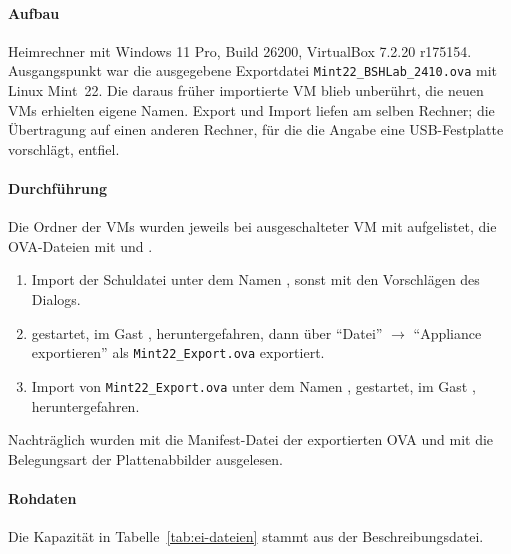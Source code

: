 \begin{messung}
\paragraph{Aufbau} Heimrechner mit Windows 11 Pro, Build 26200, VirtualBox 7.2.20 r175154. Ausgangspunkt war die ausgegebene Exportdatei \nolinkurl{Mint22_BSHLab_2410.ova} mit Linux Mint~22. Die daraus früher importierte VM  blieb unberührt, die neuen VMs erhielten eigene Namen. Export und Import liefen am selben Rechner; die Übertragung auf einen anderen Rechner, für die die Angabe eine USB-Festplatte vorschlägt, entfiel.

\paragraph{Durchführung} Die Ordner der VMs wurden jeweils bei ausgeschalteter VM mit  aufgelistet, die OVA-Dateien mit  und .
\begin{enumerate}[nosep, label=\arabic*.]
  \item Import der Schuldatei unter dem Namen , sonst mit den Vorschlägen des Dialogs.
  \item {} gestartet, im Gast , heruntergefahren, dann über \enquote{Datei} $\rightarrow$ \enquote{Appliance exportieren} als \nolinkurl{Mint22_Export.ova} exportiert.
  \item Import von \nolinkurl{Mint22_Export.ova} unter dem Namen , gestartet, im Gast , heruntergefahren.
\end{enumerate}
Nachträglich wurden mit  die Manifest-Datei der exportierten OVA und mit  die Belegungsart der Plattenabbilder ausgelesen.

\paragraph{Rohdaten} Die Kapazität in Tabelle~\ref{tab:ei-dateien} stammt aus der Beschreibungsdatei.


\end{messung}
